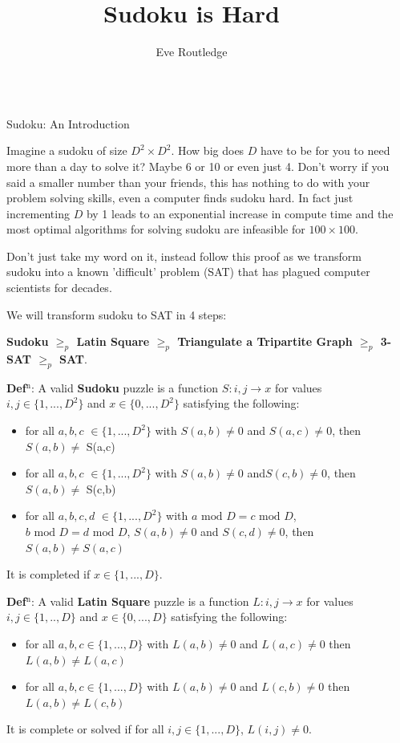 \documentclass[final]{beamer}
\title{Sudoku is Hard}
\author{Eve Routledge}
\newlength{\sepwidth}
\newlength{\colwidth}
\newcounter{row}
\newcounter{col}
\newcommand{\separatorcolumn}{\begin{column}{\sepwidth}\end{column}}
\begin{document}
\begin{frame}[t]
\begin{columns}[t]
\separatorcolumn

\begin{column}{\colwidth}
  \begin{exampleblock}{Sudoku: An Introduction}

Imagine a sudoku of size $D^2\times D^2$. How big does $D$ have to be for you to need more than a day to solve it? Maybe 6 or 10 or even just 4. Don't worry if you said a smaller number than your friends, this has nothing to do with your problem solving skills, even a computer finds sudoku hard. In fact just incrementing $D$ by 1 leads to an exponential increase in compute time and the most optimal algorithms for solving sudoku are infeasible for $100 \times 100$.

Don't just take my word on it, instead follow this proof as we transform sudoku into a known 'difficult' problem (SAT) that has plagued computer scientists for decades. 

We will transform sudoku to SAT in 4 steps:

   \textbf{Sudoku $\geq_p$ Latin Square $\geq_p$ Triangulate a Tripartite Graph $\geq_p$ 3-SAT $\geq_p$ SAT}.

	\textbf{Def$^\text{n}$}: A valid \textbf{Sudoku} puzzle is a function $ S: i,j \rightarrow x$ for values $i,j \in \{1,...,D^2\}$ and $x \in \{0,...,D^2\}$ satisfying the following:
\begin{itemize}
	\item{for all $a,b,c$  $\in \{1,...,D^2\}$ with $S(a,b)\neq 0$ and $S(a,c)\neq 0$, then $ S(a,b)\neq$ S(a,c) }
	\item{for all $a,b,c$  $\in \{1,...,D^2\}$ with $S(a,b)\neq 0$ and$ S(c,b)\neq 0$, then $S(a,b)\neq$ S(c,b) }
	\item{for all $ a,b,c,d $ $\in \{1,...,D^2\}$ with $a\text{ mod }D = c\text{ mod }D$, $b\text{ mod }D  =  d\text{ mod }D$, $S(a,b)\neq 0$  and $S(c,d) \neq 0$, then $S(a,b)\neq S(a,c)$ }
\end{itemize}
It is completed if $x \in \{1,...,D\}$.


\textbf{Def$^\text{n}$}: A valid \textbf{Latin Square} puzzle is a function $L:i,j \rightarrow x$ for values $i,j \in \{1,..,D\} $ and $x \in \{0,...,D\}$ satisfying the following:
\begin{itemize}
\item{for all $a,b,c \in \{1,...,D\}$ with $L(a,b) \neq 0 $ and $L(a,c) \neq 0$ then $L(a,b) \neq L(a,c)$}
\item{for all $a,b,c \in \{1,...,D\}$ with $L(a,b) \neq 0 $ and $L(c,b) \neq 0$ then $L(a,b) \neq L(c,b)$}
\end{itemize}
It is complete or solved if for all $i,j \in \{1,...,D\}$, $L(i,j) \neq 0$.


\end{exampleblock}
\end{column}
\end{columns}
\end{frame}
\end{document}
